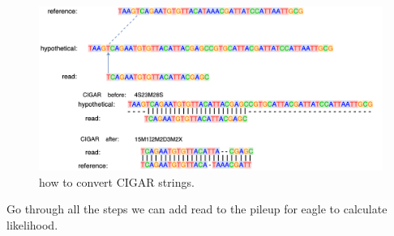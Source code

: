 \vspace{1cm}
\begin{figure}[H]
    \centering
    \includegraphics[width=1\columnwidth]{body/image/3-11.png}
    \captionsetup{labelfont=bf}
    \renewcommand{\baselinestretch}{1.0}
    \vspace{-1cm}
    \caption[CIGAR strings]{ how to convert CIGAR strings.}
    \label{f3-11}
\end{figure}

Go through all the steps we can add read to the pileup for eagle to calculate likelihood.




